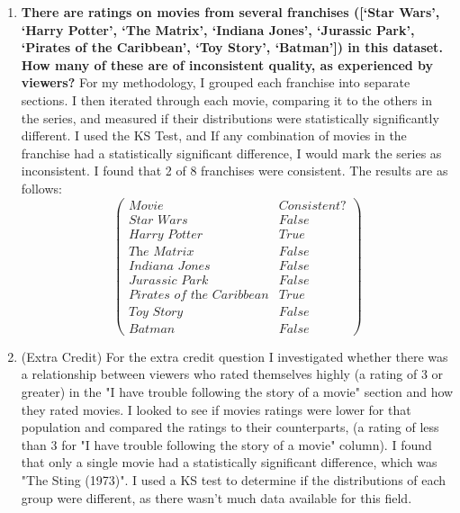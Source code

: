 \documentclass[12pt,twoside]{article}
\begin{document}
\begin{enumerate}
    \item \textbf{There are ratings on movies from several franchises ([‘Star Wars’, ‘Harry Potter’, ‘The Matrix’, ‘Indiana Jones’, ‘Jurassic Park’,  ‘Pirates of the Caribbean’, ‘Toy Story’, ‘Batman’]) in this dataset. How many of these are of inconsistent quality, as experienced by viewers?}
    \subitem
    For my methodology, I grouped each franchise into separate sections. I then iterated through each movie, comparing it to the others in the series, and measured if their distributions were statistically significantly different. I used the KS Test, and If any combination of movies in the franchise had a statistically significant difference, I would mark the series as inconsistent. I found that 2 of 8 franchises were consistent. The results are as follows:
    $$
        \begin{pmatrix}
            Movie & Consistent?\\
            \textit{Star Wars} & False \\
            \textit{Harry Potter} & True\\
            \textit{The Matrix} & False \\
            \textit{Indiana Jones} & False \\
            \textit{Jurassic Park} & False \\
            \textit{Pirates of the Caribbean} & True \\
            \textit{Toy Story} & False \\
            \textit{Batman} & False 
        \end{pmatrix}
    $$  
    \item (Extra Credit) 
    \subitem For the extra credit question I investigated whether there was a relationship between viewers who rated themselves highly (a rating of 3 or greater) in the "I have trouble following the story of a movie" section and how they rated movies. I looked to see if movies ratings were lower for that population and compared the ratings to their counterparts, (a rating of less than 3 for "I have trouble following the story of a movie" column). I found that only a single movie had a statistically significant difference, which was "The Sting (1973)". I used a KS test to determine if the distributions of each group were different, as there wasn't much data available for this field.  

\end{enumerate}
\end{document}
